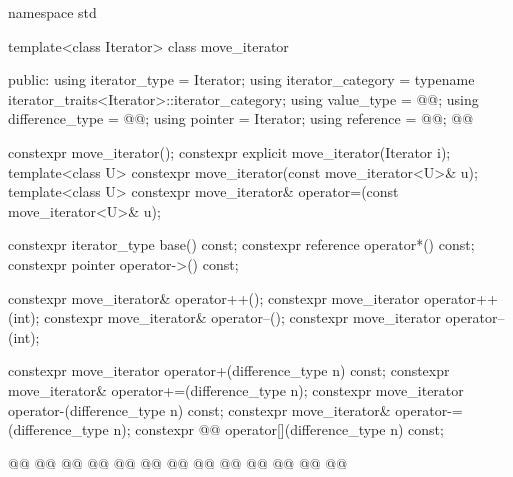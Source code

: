 %
\begin{codeblock}
namespace std {
  template<class Iterator>
  class move_iterator {
  public:
    using iterator_type     = Iterator;
    using iterator_category = typename iterator_traits<Iterator>::iterator_category;
    using value_type        = @@;
    using difference_type   = @@;
    using pointer           = Iterator;
    using reference         = @@;
    @@

    constexpr move_iterator();
    constexpr explicit move_iterator(Iterator i);
    template<class U> constexpr move_iterator(const move_iterator<U>& u);
    template<class U> constexpr move_iterator& operator=(const move_iterator<U>& u);

    constexpr iterator_type base() const;
    constexpr reference operator*() const;
    constexpr pointer operator->() const;

    constexpr move_iterator& operator++();
    constexpr move_iterator operator++(int);
    constexpr move_iterator& operator--();
    constexpr move_iterator operator--(int);

    constexpr move_iterator operator+(difference_type n) const;
    constexpr move_iterator& operator+=(difference_type n);
    constexpr move_iterator operator-(difference_type n) const;
    constexpr move_iterator& operator-=(difference_type n);
    constexpr @@ operator[](difference_type n) const;

    @@
    @@
      @@
        @@
    @@
      @@
        @@
    @@
      @@
        @@
    @@
      @@
        @@

}}
\end{codeblock}
